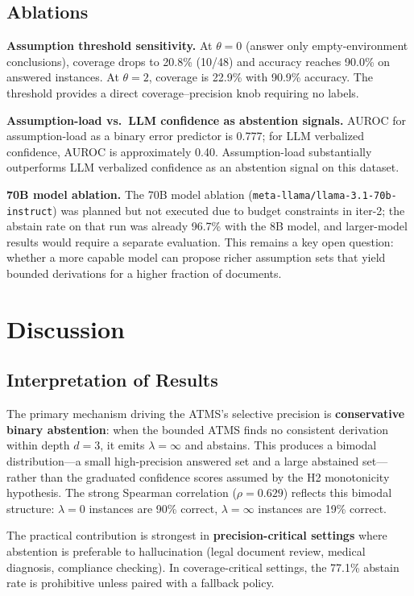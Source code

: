 \documentclass[11pt,letterpaper]{article}
\begin{document}
\subsection{Ablations}

\noindent\textbf{Assumption threshold sensitivity.} At $\theta=0$ (answer only empty-environment
conclusions), coverage drops to 20.8\% (10/48) and accuracy reaches 90.0\% on answered instances. At
$\theta=2$, coverage is 22.9\% with 90.9\% accuracy. The threshold provides a direct
coverage--precision knob requiring no labels.

\noindent\textbf{Assumption-load vs.\ LLM confidence as abstention signals.} AUROC for assumption-load
as a binary error predictor is 0.777; for LLM verbalized confidence, AUROC is approximately 0.40.
Assumption-load substantially outperforms LLM verbalized confidence as an abstention signal on this
dataset.

\noindent\textbf{70B model ablation.} The 70B model ablation (\texttt{meta-llama/llama-3.1-70b-instruct})
was planned but not executed due to budget constraints in iter-2; the abstain rate on that run was
already 96.7\% with the 8B model, and larger-model results would require a separate evaluation. This
remains a key open question: whether a more capable model can propose richer assumption sets that yield
bounded derivations for a higher fraction of documents.

\section{Discussion}

\subsection{Interpretation of Results}

The primary mechanism driving the ATMS's selective precision is \textbf{conservative binary abstention}:
when the bounded ATMS finds no consistent derivation within depth $d=3$, it emits $\lambda=\infty$ and
abstains. This produces a bimodal distribution---a small high-precision answered set and a large
abstained set---rather than the graduated confidence scores assumed by the H2 monotonicity hypothesis.
The strong Spearman correlation ($\rho=0.629$) reflects this bimodal structure: $\lambda=0$ instances
are 90\% correct, $\lambda=\infty$ instances are 19\% correct.

The practical contribution is strongest in \textbf{precision-critical settings} where abstention is
preferable to hallucination (legal document review, medical diagnosis, compliance checking). In
coverage-critical settings, the 77.1\% abstain rate is prohibitive unless paired with a fallback
policy.
\end{document}
